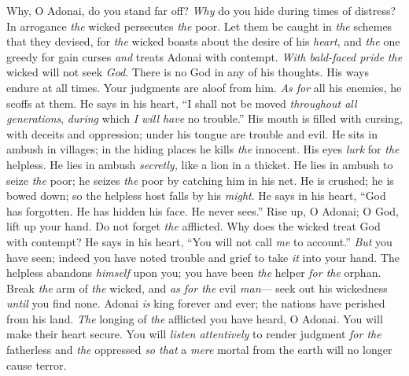 \begin{biblechapter} %
 Why, O Adonai, do you stand far off? 
\textit{Why} do you hide during times of distress?
\verse In arrogance \textit{the} wicked persecutes \textit{the} poor. 
Let them be caught in \textit{the} schemes that they devised,
\verse for \textit{the} wicked boasts about the desire of his \textit{heart}, 
and \textit{the} one greedy for gain curses \textit{and} treats Adonai with contempt.
\verse \textit{With bald-faced pride} \textit{the} wicked will not seek \textit{God}. 
There is no God in any of his thoughts.
\verse His ways endure at all times. 
Your judgments are aloof from him. 
\textit{As for} all his enemies, he scoffs at them.
\verse He says in his heart, “I shall not be moved 
\textit{throughout all generations}, \textit{during} which \textit{I will have} no trouble.”
\verse His mouth is filled with cursing, 
with deceits and oppression; 
under his tongue are trouble and evil.
\verse He sits in ambush in villages; 
in the hiding places he kills \textit{the} innocent. 
His eyes \textit{lurk} for \textit{the} helpless.
\verse He lies in ambush \textit{secretly,} like a lion in a thicket. 
He lies in ambush to seize \textit{the} poor; 
he seizes \textit{the} poor by catching him in his net.
\verse He is crushed; he is bowed down; 
so the helpless host falls by his \textit{might}.
\verse He says in his heart, “God has forgotten. 
He has hidden his face. 
He never sees.”
\verse Rise up, O Adonai; 
O God, lift up your hand. 
Do not forget \textit{the} afflicted.
\verse Why does the wicked treat God with contempt? 
He says in his heart, “You will not call \textit{me} to account.”
\verse \textit{But} you have seen; indeed you have noted trouble and grief 
to take \textit{it} into your hand. 
The helpless abandons \textit{himself} upon you; 
you have been \textit{the} helper \textit{for the} orphan.
\verse Break \textit{the} arm of \textit{the} wicked, 
and \textit{as for the} evil \textit{man}— 
seek out his wickedness \textit{until} you find none.
\verse Adonai \textit{is} king forever and ever; 
the nations have perished from his land.
\verse \textit{The} longing of \textit{the} afflicted you have heard, O Adonai. 
You will make their heart secure. You will \textit{listen attentively}
\verse to render judgment \textit{for the} fatherless and \textit{the} oppressed 
\textit{so that} a \textit{mere} mortal from the earth will no longer cause terror.
\end{biblechapter}

